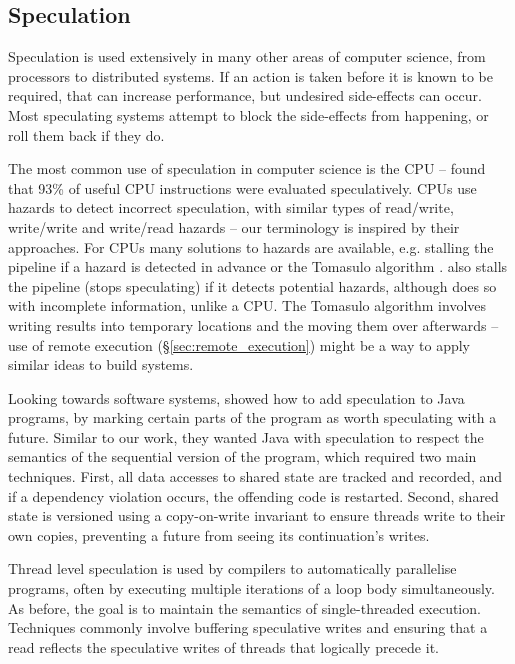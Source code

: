\subsection{Speculation}

Speculation is used extensively in many other areas of computer science, from processors to distributed systems. If an action is taken before it is known to be required, that can increase performance, but undesired side-effects can occur. Most speculating systems attempt to block the side-effects from happening, or roll them back if they do.

The most common use of speculation in computer science is the CPU -- \citet{swanson_cpu_speculation} found that 93\% of useful CPU instructions were evaluated speculatively. CPUs use hazards to detect incorrect speculation, with similar types of read/write, write/write and write/read hazards \cite{patterson_cpu_design} -- our terminology is inspired by their approaches. For CPUs many solutions to hazards are available, e.g. stalling the pipeline if a hazard is detected in advance or the Tomasulo algorithm \cite{tomasulo}. \Rattle also stalls the pipeline (stops speculating) if it detects potential hazards, although does so with incomplete information, unlike a CPU. The Tomasulo algorithm involves writing results into temporary locations and the moving them over afterwards -- use of remote execution (\S\ref{sec:remote_execution}) might be a way to apply similar ideas to build systems.

Looking towards software systems, \citet{welc2005safe} showed how to add speculation to Java programs, by marking certain parts of the program as worth speculating with a future. Similar to our work, they wanted Java with speculation to respect the semantics of the sequential version of the program, which required two main techniques. First, all data accesses to shared state are tracked and recorded, and if a dependency violation occurs, the offending code is restarted.  Second, shared state is versioned using a copy-on-write invariant to ensure threads write to their own copies, preventing a future from seeing its continuation's writes.

Thread level speculation \cite{steffan1998potential} is used by compilers to automatically parallelise programs, often by executing multiple iterations of a loop body simultaneously. As before, the goal is to maintain the semantics of single-threaded execution. Techniques commonly involve buffering speculative writes \cite{steffan2000scalable} and ensuring that a read reflects the speculative writes of threads that logically precede it.


